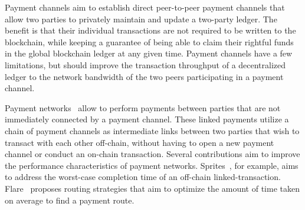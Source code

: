 \documentclass[sigconf]{acmart}
\begin{document}

Payment channels aim to establish direct peer-to-peer payment channels that allow two parties to privately maintain and update a two-party ledger. The benefit is that their individual transactions are not required to be written to the blockchain, while keeping a guarantee of being able to claim their rightful funds in the global blockchain ledger at any given time. Payment channels have a few limitations, but should improve the transaction throughput of a decentralized ledger to the network bandwidth of the two peers participating in a payment channel.

Payment networks~\cite{lightning, raiden} allow to perform payments between parties that are not immediately connected by a payment channel. These linked payments utilize a chain of payment channels as intermediate links between two parties that wish to transact with each other off-chain, without having to open a new payment channel or conduct an on-chain transaction. Several contributions aim to improve the performance characteristics of payment networks. Sprites~\cite{sprites}, for example, aims to address the worst-case completion time of an off-chain linked-transaction. Flare~\cite{flare} proposes routing strategies that aim to optimize the amount of time taken on average to find a payment route.

\end{document}
